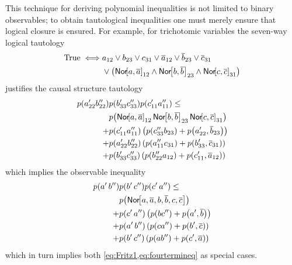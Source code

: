 \begin{EDITING...}
This technique for deriving polynomial inequalities is not limited to binary observables; to obtain tautological inequalities one must merely ensure that logical closure is ensured. For example, for trichotomic variables the seven-way logical tautology
\begin{align*}
\mbox{True}\iff& a_{12} \lor b_{23} \lor c_{31} \lor \ot{a}_{12} \lor \ot{b}_{23} \lor \ot{c}_{31} 
\\&\lor \parens*{\Nor{a,\ot{a}}_{12} \land \Nor{b,\ot{b}}_{23} \land \Nor{c,\ot{c}}_{31}} 
\end{align*}
justifies
%
%
the causal structure tautology
\begin{align}\begin{split}
\p{a'_{22} b''_{22}}&\p{b'_{33} c''_{33}}\p{c'_{11} a''_{11}}\leq
\\ &\p{\Nor{a,\ot{a}}_{12}  \Nor{b,\ot{b}}_{23} \Nor{c,\ot{c}}_{31}}
\\+&\p{c'_{11} a''_{11}}\left(\p{c''_{33} b_{23}}+\p{a'_{22},\ot{b}_{23}}\right)
\\+&\p{a'_{22} b''_{22}}\left(\p{a''_{11} c_{31}}+\p{b'_{33},\ot{c}_{31}}\right)
\\+&\p{b'_{33} c''_{33}}\left(\p{b''_{22} a_{12}}+\p{c'_{11},\ot{a}_{12}}\right)
\end{split}\end{align}
which implies the observable inequality
\begin{align}\begin{split}
\p{a'\, b''}&\p{b'\, c''}\p{c'\, a''}\leq
\\ &\p{\Nor{a,\ot{a},b,\ot{b},c,\ot{c}}}
\\+&\p{c'\, a''}\left(\p{b c''}+\p{a',\ot{b}}\right)
\\+&\p{a'\, b''}\left(\p{c a''}+\p{b',\ot{c}}\right)
\\+&\p{b'\, c''}\left(\p{a b''}+\p{c',\ot{a}}\right)
\end{split}\end{align}
which in turn implies both \cref{eq:Fritz1,eq:fourtermineq} as special cases.


\end{EDITING...}
